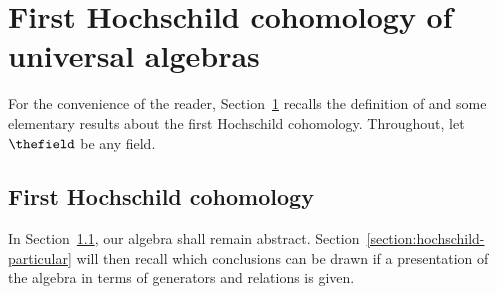 \documentclass[pdftex]{sigma}
\numberwithin{equation}{section}
\begin{document}
\section{First Hochschild cohomology of universal algebras}
\label{section:hochschild}
For the convenience of the reader, Section~\ref{section:hochschild} recalls the definition of and some elementary results about the first Hochschild cohomology. Throughout, let $\thefield$ be any field.


\subsection{First Hochschild cohomology}
\label{section:hochschild-general}
In Section~\ref{section:hochschild-general}, our algebra shall remain abstract. Section~\ref{section:hochschild-particular} will then recall which conclusions can be drawn if a presentation of the algebra in terms of generators and relations is given.
\end{document}
